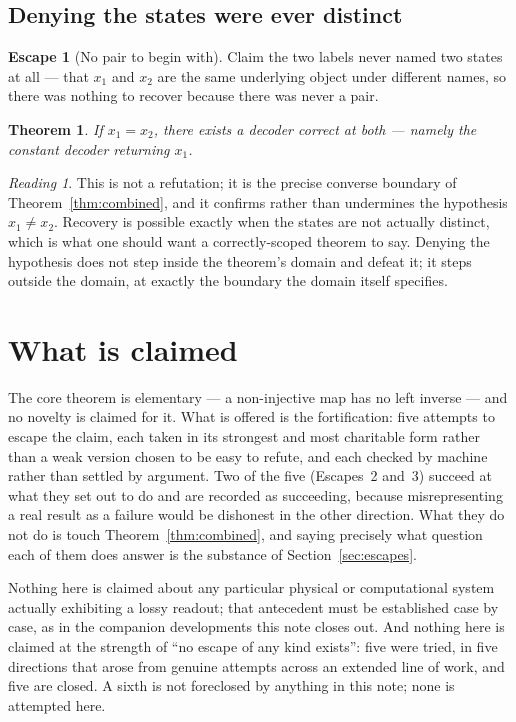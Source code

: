 \documentclass[10pt,twocolumn]{article}
\theoremstyle{plain}
\newtheorem{theorem}{Theorem}
\theoremstyle{definition}
\newtheorem{escape}{Escape}
\theoremstyle{remark}
\newtheorem*{reading}{Reading}
\begin{document}
\subsection{Denying the states were ever distinct}

\begin{escape}[No pair to begin with]
Claim the two labels never named two states at all --- that $x_1$ and $x_2$ are the same underlying object under different names, so there was nothing to recover because there was never a pair.
\end{escape}

\begin{theorem}\label{thm:escape5}
If $x_1 = x_2$, there exists a decoder correct at both --- namely the constant decoder returning $x_1$.
\end{theorem}

\begin{reading}
This is not a refutation; it is the precise converse boundary of Theorem~\ref{thm:combined}, and it confirms rather than undermines the hypothesis $x_1 \neq x_2$. Recovery is possible exactly when the states are not actually distinct, which is what one should want a correctly-scoped theorem to say. Denying the hypothesis does not step inside the theorem's domain and defeat it; it steps outside the domain, at exactly the boundary the domain itself specifies.
\end{reading}

\section{What is claimed}\label{sec:claimed}

The core theorem is elementary --- a non-injective map has no left inverse --- and no novelty is claimed for it. What is offered is the fortification: five attempts to escape the claim, each taken in its strongest and most charitable form rather than a weak version chosen to be easy to refute, and each checked by machine rather than settled by argument. Two of the five (Escapes~2 and~3) succeed at what they set out to do and are recorded as succeeding, because misrepresenting a real result as a failure would be dishonest in the other direction. What they do not do is touch Theorem~\ref{thm:combined}, and saying precisely what question each of them does answer is the substance of Section~\ref{sec:escapes}.

Nothing here is claimed about any particular physical or computational system actually exhibiting a lossy readout; that antecedent must be established case by case, as in the companion developments this note closes out. And nothing here is claimed at the strength of ``no escape of any kind exists'': five were tried, in five directions that arose from genuine attempts across an extended line of work, and five are closed. A sixth is not foreclosed by anything in this note; none is attempted here.
\end{document}
